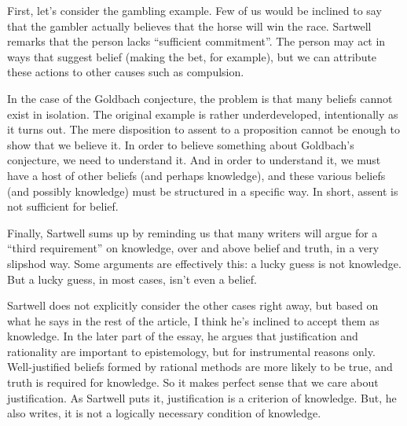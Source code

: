 First, let's consider the gambling example. Few of us would be inclined to say that the gambler actually believes that the horse will win the race. Sartwell remarks that the person lacks ``sufficient commitment''. The person may act in ways that suggest belief (making the bet, for example), but we can attribute these actions to other causes such as compulsion.

In the case of the Goldbach conjecture, the problem is that many beliefs cannot exist in isolation. The original example is rather underdeveloped, intentionally as it turns out. The mere disposition to assent to a proposition cannot be enough to show that we believe it. In order to believe something about Goldbach's conjecture, we need to understand it. And in order to understand it, we must have a host of other beliefs (and perhaps knowledge), and these various beliefs (and possibly knowledge) must be structured in a specific way. In short, assent is not sufficient for belief.

Finally, Sartwell sums up by reminding us that many writers will argue for a ``third requirement'' on knowledge, over and above belief and truth, in a very slipshod way. Some arguments are effectively this: a lucky guess is not knowledge. But a lucky guess, in most cases, isn't even a belief.

Sartwell does not explicitly consider the other cases right away, but based on what he says in the rest of the article, I think he's inclined to accept them as knowledge. In the later part of the essay, he argues that justification and rationality are important to epistemology, but for instrumental reasons only. Well-justified beliefs formed by rational methods are more likely to be true, and truth is required for knowledge. So it makes perfect sense that we care about justification. As Sartwell puts it, justification is a criterion of knowledge. But, he also writes, it is not a logically necessary condition of knowledge.

